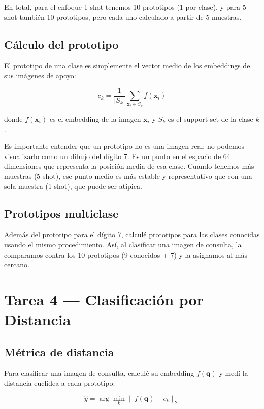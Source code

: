 \documentclass[../../__memoria.tex]{subfiles}
\begin{document}
En total, para el enfoque 1-shot tenemos 10 prototipos (1 por clase), y para 5-shot también 10 prototipos, pero cada uno calculado a partir de 5 muestras.

\subsection{Cálculo del prototipo}

El prototipo de una clase es simplemente el vector medio de los embeddings de sus imágenes de apoyo:

\[
c_k = \frac{1}{|S_k|} \sum_{\mathbf{x}_i \in S_k} f(\mathbf{x}_i)
\]

donde $f(\mathbf{x}_i)$ es el embedding de la imagen $\mathbf{x}_i$ y $S_k$ es el support set de la clase $k$.

Es importante entender que un prototipo no es una imagen real: no podemos visualizarlo como un dibujo del dígito 7. Es un punto en el espacio de 64 dimensiones que representa la posición media de esa clase. Cuando tenemos más muestras (5-shot), ese punto medio es más estable y representativo que con una sola muestra (1-shot), que puede ser atípica.

\subsection{Prototipos multiclase}

Además del prototipo para el dígito 7, calculé prototipos para las clases conocidas usando el mismo procedimiento. Así, al clasificar una imagen de consulta, la comparamos contra los 10 prototipos (9 conocidos + 7) y la asignamos al más cercano.

\section[Tarea 4: Clasificación]{Tarea 4 --- Clasificación por Distancia}

\subsection{Métrica de distancia}

Para clasificar una imagen de consulta, calculé su embedding $f(\mathbf{q})$ y medí la distancia euclídea a cada prototipo:

\[
\hat{y} = \arg\min_k \| f(\mathbf{q}) - c_k \|_2
\]
\end{document}

